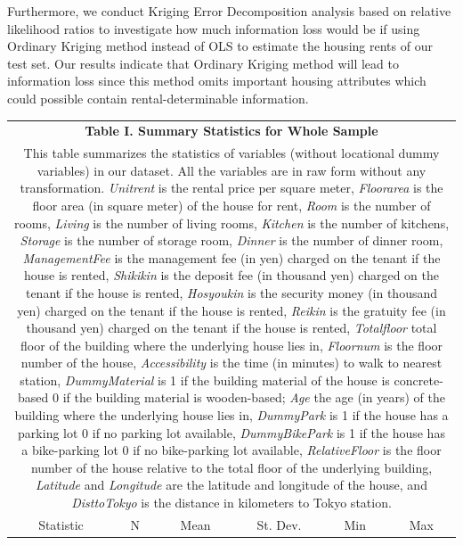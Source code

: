 \documentclass[a4paper, 12pt]{article} %
\newcommand{\var}[1][\textit]{#1}
\begin{document}
Furthermore, we conduct Kriging Error Decomposition analysis based on relative likelihood ratios to investigate how much information loss would be if using Ordinary Kriging method instead of OLS to estimate the housing rents of our test set. Our results indicate that Ordinary Kriging method will lead to information loss since this method omits important housing attributes which could possible contain rental-determinable information.
\newpage

\begin{longtable}[c]{cccccc}
\label{tb1} \\
\multicolumn{6}{c}{\textbf{Table I. Summary Statistics for Whole Sample}} \\
\multicolumn{6}{p{11.5cm}}{This table summarizes the statistics of variables (without locational dummy variables) in our dataset. All the variables are in raw form without any transformation. \var{Unitrent} is the rental price per square meter, \var{Floorarea} is the floor area (in square meter) of the house for rent, \var{Room} is the number of rooms, \var{Living} is the number of living rooms, \var{Kitchen} is the number of kitchens, \var{Storage} is the number of storage room, \var{Dinner} is the number of dinner room, \var{ManagementFee} is the management fee (in yen) charged on the tenant if the house is rented, \var{Shikikin} is the deposit fee (in thousand yen) charged on the tenant if the house is rented, \var{Hosyoukin} is the security money (in thousand yen) charged on the tenant if the house is rented, \var{Reikin} is the gratuity fee (in thousand yen) charged on the tenant if the house is rented, \var{Totalfloor} total floor of the building where the underlying house lies in, \var{Floornum} is the floor number of the house, \var{Accessibility} is the time (in minutes) to walk to nearest station, \var{DummyMaterial} is 1 if the building material of the house is concrete-based 0 if the building material is wooden-based; \var{Age} the age (in years) of the building where the underlying house lies in, \var{DummyPark} is 1 if the house has a parking lot 0 if no parking lot available, \var{DummyBikePark} is 1 if the house has a bike-parking lot 0 if no bike-parking lot available, \var{RelativeFloor} is the floor number of the house relative to the total floor of the underlying building, \var{Latitude} and \var{Longitude} are the latitude and longitude of the house, and \var{DisttoTokyo} is the distance in kilometers to Tokyo station.} \\
\hline
Statistic & N & Mean & St. Dev. & Min & Max \\

\end{longtable}
\end{document}
